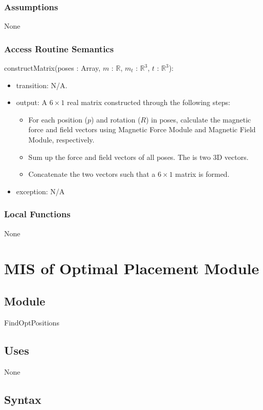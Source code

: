 \documentclass[12pt, titlepage]{article}
\begin{document}
\subsubsection{Assumptions}
None 

\subsubsection{Access Routine Semantics}

\noindent constructMatrix(poses : Array, $m$ : $\mathbb{R}$, $m_t$ : $\mathbb{R}^3$, $t$ : $\mathbb{R}^3$):
\begin{itemize}
\item transition: N/A.
\item output: A $6 \times 1$ real matrix constructed through the following steps:
\begin{itemize}
  \item For each position ($p$) and rotation ($R$) in poses, calculate the magnetic force and field vectors using Magnetic Force Module and Magnetic Field Module, respectively. 
  \item Sum up the force and field vectors of all poses. The is two 3D vectors. 
  \item Concatenate the two vectors such that a $6 \times 1$ matrix is formed.
\end{itemize}
\item exception: N/A
\end{itemize}

\subsubsection{Local Functions}
None

\newpage


\section{MIS of Optimal Placement Module} \label{MISOptPlacement}

\subsection{Module}
FindOptPositions

\subsection{Uses}
None

\subsection{Syntax}
\end{document}
